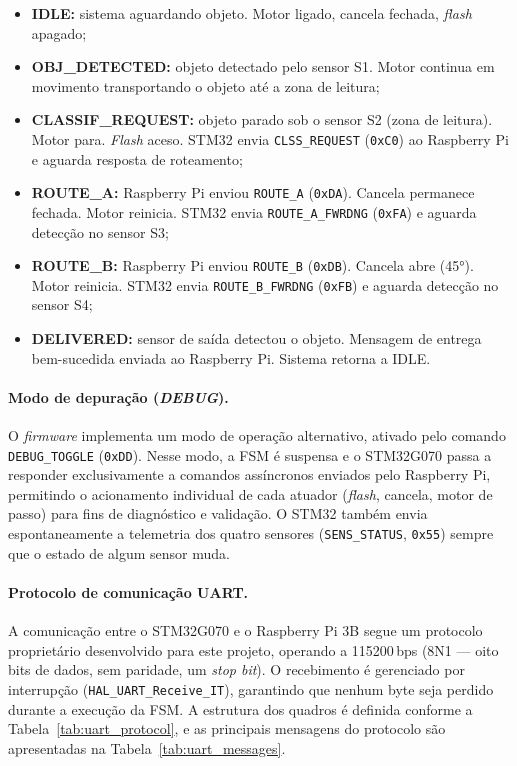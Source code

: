 \begin{itemize}
    \item \textbf{IDLE:} sistema aguardando objeto. Motor ligado, cancela
          fechada, \textit{flash} apagado;
    \item \textbf{OBJ\_DETECTED:} objeto detectado pelo sensor S1. Motor
          continua em movimento transportando o objeto até a zona de leitura;
    \item \textbf{CLASSIF\_REQUEST:} objeto parado sob o sensor S2 (zona de
          leitura). Motor para. \textit{Flash} aceso. STM32 envia
          \texttt{CLSS\_REQUEST} (\texttt{0xC0}) ao Raspberry Pi e aguarda
          resposta de roteamento;
    \item \textbf{ROUTE\_A:} Raspberry Pi enviou \texttt{ROUTE\_A}
          (\texttt{0xDA}). Cancela permanece fechada. Motor reinicia. STM32
          envia \texttt{ROUTE\_A\_FWRDNG} (\texttt{0xFA}) e aguarda detecção
          no sensor S3;
    \item \textbf{ROUTE\_B:} Raspberry Pi enviou \texttt{ROUTE\_B}
          (\texttt{0xDB}). Cancela abre (45°). Motor reinicia. STM32 envia
          \texttt{ROUTE\_B\_FWRDNG} (\texttt{0xFB}) e aguarda detecção no
          sensor S4;
    \item \textbf{DELIVERED:} sensor de saída detectou o objeto. Mensagem de
          entrega bem-sucedida enviada ao Raspberry Pi. Sistema retorna a
          IDLE.
\end{itemize}

\paragraph{Modo de depuração (\textit{DEBUG}).}
O \textit{firmware} implementa um modo de operação alternativo, ativado pelo
comando \texttt{DEBUG\_TOGGLE} (\texttt{0xDD}). Nesse modo, a FSM é suspensa
e o STM32G070 passa a responder exclusivamente a comandos assíncronos
enviados pelo Raspberry Pi, permitindo o acionamento individual de cada
atuador (\textit{flash}, cancela, motor de passo) para fins de diagnóstico e
validação. O STM32 também envia espontaneamente a telemetria dos quatro
sensores (\texttt{SENS\_STATUS}, \texttt{0x55}) sempre que o estado de algum
sensor muda.

\paragraph{Protocolo de comunicação UART.}
A comunicação entre o STM32G070 e o Raspberry Pi 3B segue um protocolo
proprietário desenvolvido para este projeto, operando a 115200\,bps
(8N1 — oito bits de dados, sem paridade, um \textit{stop bit}). O
recebimento é gerenciado por interrupção (\texttt{HAL\_UART\_Receive\_IT}),
garantindo que nenhum byte seja perdido durante a execução da FSM. A
estrutura dos quadros é definida conforme a Tabela~\ref{tab:uart_protocol},
e as principais mensagens do protocolo são apresentadas na
Tabela~\ref{tab:uart_messages}.

